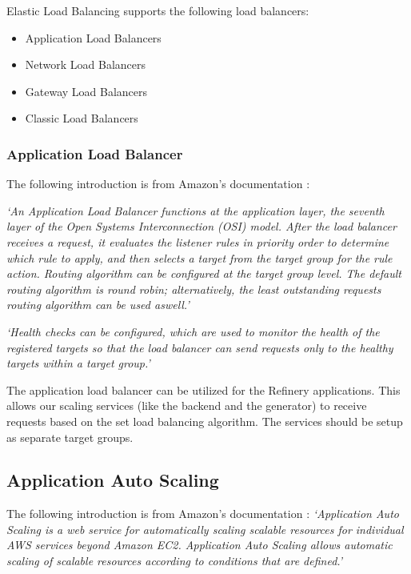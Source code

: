		Elastic Load Balancing supports the following load balancers: 
		\begin{itemize}
			\item Application Load Balancers
			\item Network Load Balancers
			\item Gateway Load Balancers
			\item Classic Load Balancers
		\end{itemize}

		\subsubsection{Application Load Balancer} \label{backgalb}
			The following introduction is from Amazon's documentation \cite{elb}:

			\textit{`An Application Load Balancer \cite{elb} functions at the application layer, the seventh layer of the Open Systems Interconnection (OSI)
			model. After the load balancer receives a request, it evaluates the listener rules in priority order to determine which 
			rule to apply, and then selects a target from the target group for the rule action. 
			Routing algorithm can be configured at the target group level. 
			The default routing algorithm is round robin; alternatively, the least outstanding requests routing algorithm can be used aswell.'}

			\textit{`Health checks can be configured, which are used to monitor the health of the registered targets so that the 
			load balancer can send requests only to the healthy targets within a target group.'}

			The application load balancer can be utilized for the Refinery applications. This allows our scaling services (like the backend and 
			the generator) to receive requests based on the set load balancing algorithm. The services should be setup as separate target groups.

	\subsection{Application Auto Scaling} \label{backgautoscaling}
		The following introduction is from Amazon's documentation \cite{autoscale}:
		\textit{`Application Auto Scaling \cite{autoscale} is a web service for automatically scaling scalable resources 
		for individual AWS services beyond Amazon EC2. Application Auto Scaling allows automatic scaling of 
		scalable resources according to conditions that are defined.'}

